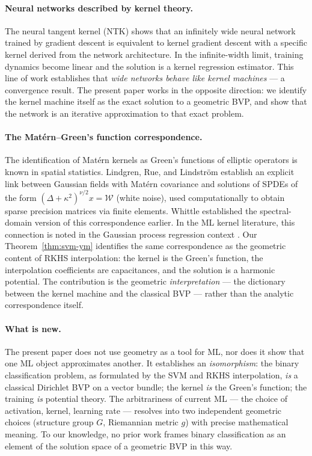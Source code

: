 \documentclass[11pt, a4paper]{article}
\theoremstyle{plain}
\theoremstyle{definition}
\begin{document}
\paragraph{Neural networks described by kernel theory.}
The neural tangent kernel (NTK) \cite{jacot2018ntk} shows that an infinitely wide
neural network trained by gradient descent is equivalent to kernel gradient descent
with a specific kernel derived from the network architecture. In the infinite-width
limit, training dynamics become linear and the solution is a kernel regression
estimator. This line of work establishes that \emph{wide networks behave like kernel
machines} --- a convergence result. The present paper works in the opposite
direction: we identify the kernel machine itself as the exact solution to a
geometric BVP, and show that the network is an iterative approximation to that
exact problem.

\paragraph{The Matérn--Green's function correspondence.}
The identification of Matérn kernels as Green's functions of elliptic operators is
known in spatial statistics. Lindgren, Rue, and Lindström \cite{lindgren2011spde}
establish an explicit link between Gaussian fields with Matérn covariance and
solutions of SPDEs of the form $(\Delta + \kappa^2)^{\nu/2} x = \mathcal{W}$
(white noise), used computationally to obtain sparse precision matrices via finite
elements. Whittle \cite{whittle1963} established the spectral-domain version of
this correspondence earlier. In the ML kernel literature, this connection is noted
in the Gaussian process regression context \cite{scholkopf2002}. Our Theorem~\ref{thm:svm-ym}
identifies the same correspondence as the geometric content of RKHS interpolation:
the kernel is the Green's function, the interpolation coefficients are capacitances,
and the solution is a harmonic potential. The contribution is the geometric
\emph{interpretation} --- the dictionary between the kernel machine and the
classical BVP --- rather than the analytic correspondence itself.

\paragraph{What is new.}
The present paper does not use geometry as a tool for ML, nor does it show that one
ML object approximates another. It establishes an \emph{isomorphism}: the binary
classification problem, as formulated by the SVM and RKHS interpolation, \emph{is}
a classical Dirichlet BVP on a vector bundle; the kernel \emph{is} the Green's
function; the training \emph{is} potential theory. The arbitrariness of current
ML --- the choice of activation, kernel, learning rate --- resolves into two
independent geometric choices (structure group $G$, Riemannian metric $g$) with
precise mathematical meaning. To our knowledge, no prior work frames binary
classification as an element of the solution space of a geometric BVP in this
way.
\end{document}
